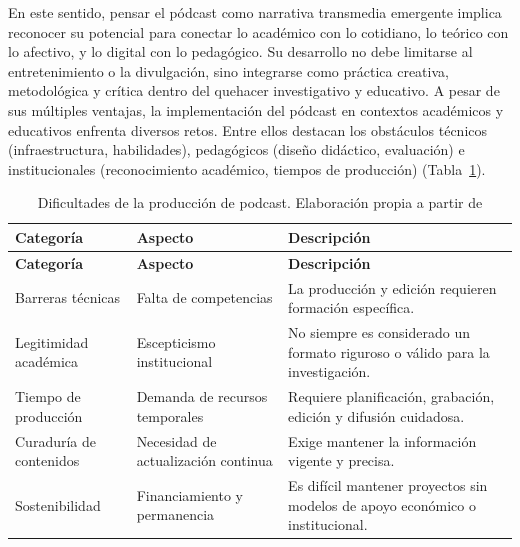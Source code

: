 \documentclass[
  spanish,
  11pt,
  a4paper,
]{scrbook}
\begin{document}
\endgroup

En este sentido, pensar el pódcast como narrativa transmedia emergente
implica reconocer su potencial para conectar lo académico con lo
cotidiano, lo teórico con lo afectivo, y lo digital con lo pedagógico.
Su desarrollo no debe limitarse al entretenimiento o la divulgación,
sino integrarse como práctica creativa, metodológica y crítica dentro
del quehacer investigativo y educativo. A pesar de sus múltiples
ventajas, la implementación del pódcast en contextos académicos y
educativos enfrenta diversos retos. Entre ellos destacan los obstáculos
técnicos (infraestructura, habilidades), pedagógicos (diseño didáctico,
evaluación) e institucionales (reconocimiento académico, tiempos de
producción) (Tabla~\ref{tbl-2}).

\begingroup
\scriptsize

\begin{longtable}[]{@{}
  >{\raggedright\arraybackslash}p{}
  >{\raggedright\arraybackslash}p{}
  >{\raggedright\arraybackslash}p{}@{}}
\caption{Dificultades de la producción de podcast. Elaboración propia a
partir de \textcite{McLoughlin2010}}\label{tbl-2}\tabularnewline
\toprule\noalign{}
\begin{minipage}[b]{\linewidth}\raggedright
\textbf{Categoría}
\end{minipage} & \begin{minipage}[b]{\linewidth}\raggedright
\textbf{Aspecto}
\end{minipage} & \begin{minipage}[b]{\linewidth}\raggedright
\textbf{Descripción}
\end{minipage} \\
\midrule\noalign{}
\endfirsthead
\toprule\noalign{}
\begin{minipage}[b]{\linewidth}\raggedright
\textbf{Categoría}
\end{minipage} & \begin{minipage}[b]{\linewidth}\raggedright
\textbf{Aspecto}
\end{minipage} & \begin{minipage}[b]{\linewidth}\raggedright
\textbf{Descripción}
\end{minipage} \\
\midrule\noalign{}
\endhead
\bottomrule\noalign{}
\endlastfoot
Barreras técnicas & Falta de competencias & La producción y edición
requieren formación específica. \\
Legitimidad académica & Escepticismo institucional & No siempre es
considerado un formato riguroso o válido para la investigación. \\
Tiempo de producción & Demanda de recursos temporales & Requiere
planificación, grabación, edición y difusión cuidadosa. \\
Curaduría de contenidos & Necesidad de actualización continua & Exige
mantener la información vigente y precisa. \\
Sostenibilidad & Financiamiento y permanencia & Es difícil mantener
proyectos sin modelos de apoyo económico o institucional. \\
\end{longtable}
\end{document}
